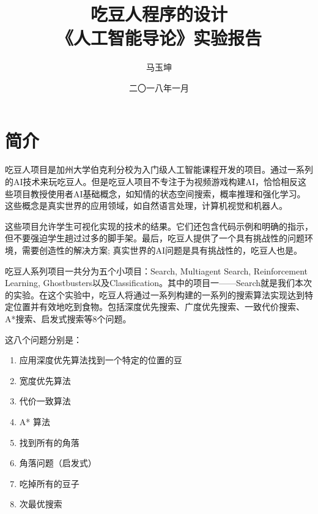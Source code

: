 \documentclass[forprint]{WHUBachelor}
\begin{document}

\title{吃豆人程序的设计 \\ {\Large《人工智能导论》实验报告}}
\author{马玉坤}                            %
\date{二〇一八年一月}                    %

\maketitle
\frontmatter
{}              %
\tableofcontents
\mainmatter %

\chapter{简介}

吃豆人项目是加州大学伯克利分校为入门级人工智能课程开发的项目。通过一系列的AI技术来玩吃豆人。但是吃豆人项目不专注于为视频游戏构建AI，恰恰相反这些项目教授使用者AI基础概念，如知情的状态空间搜索，概率推理和强化学习。这些概念是真实世界的应用领域，如自然语言处理，计算机视觉和机器人。

这些项目允许学生可视化实现的技术的结果。它们还包含代码示例和明确的指示，但不要强迫学生趟过过多的脚手架。最后，吃豆人提供了一个具有挑战性的问题环境，需要创造性的解决方案; 真实世界的AI问题是具有挑战性的，吃豆人也是。

吃豆人系列项目一共分为五个小项目：Search, Multiagent Search, Reinforcement Learning, Ghostbusters以及Classification。其中的项目一——Search就是我们本次的实验。在这个实验中，吃豆人将通过一系列构建的一系列的搜索算法实现达到特定位置并有效地吃到食物。包括深度优先搜索、广度优先搜索、一致代价搜索、A*搜索、启发式搜索等8个问题。

这八个问题分别是：

\begin{enumerate}
\item 应用深度优先算法找到一个特定的位置的豆
\item 宽度优先算法
\item 代价一致算法
\item A* 算法
\item 找到所有的角落
\item 角落问题（启发式）
\item 吃掉所有的豆子
\item 次最优搜索
\end{enumerate}
\end{document}
